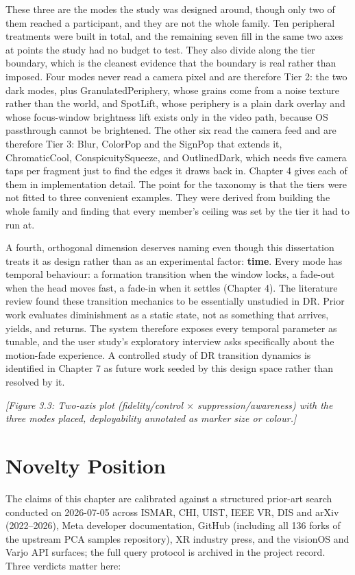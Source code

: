These three are the modes the study was designed around, though only two of them reached a
participant, and they are not the whole family. Ten peripheral treatments were
built in total, and the remaining seven fill in the same two axes at points the study had no budget
to test. They also divide along the tier boundary, which is the cleanest evidence that the boundary
is real rather than imposed. Four modes never read a camera pixel and are therefore Tier 2: the two
dark modes, plus GranulatedPeriphery, whose grains come from a noise texture rather than the world,
and SpotLift, whose periphery is a plain dark overlay and whose focus-window brightness lift exists
only in the video path, because OS passthrough cannot be brightened. The other six read the camera
feed and are therefore Tier 3: Blur, ColorPop and the SignPop that extends it, ChromaticCool,
ConspicuitySqueeze, and OutlinedDark, which needs five camera taps per fragment just to find the
edges it draws back in. Chapter 4 gives each of them in implementation detail. The point for the
taxonomy is that the tiers were not fitted to three convenient examples. They were derived from
building the whole family and finding that every member's ceiling was set by the tier it had to run
at.

A fourth, orthogonal dimension deserves naming even though this dissertation treats it as design
rather than as an experimental factor: \textbf{time}. Every mode has temporal behaviour: a formation
transition when the window locks, a fade-out when the head moves fast, a fade-in when it settles
(Chapter 4). The literature review found these transition mechanics to be essentially unstudied
in DR. Prior work evaluates diminishment as a static state, not as something that arrives, yields,
and returns. The system therefore exposes every temporal parameter as tunable, and the user study's
exploratory interview asks specifically about the motion-fade experience. A controlled study of DR
transition dynamics is identified in Chapter 7 as future work seeded by this design space rather than
resolved by it.

\textit{[Figure 3.3: Two-axis plot (fidelity/control $\times$ suppression/awareness) with the three modes
placed, deployability annotated as marker size or colour.]}

\section{Novelty Position}

The claims of this chapter are calibrated against a structured prior-art search conducted on
2026-07-05 across ISMAR, CHI, UIST, IEEE VR, DIS and arXiv (2022–2026), Meta developer documentation,
GitHub (including all 136 forks of the upstream PCA samples repository), XR industry press, and the
visionOS and Varjo API surfaces; the full query protocol is archived in the project record. Three
verdicts matter here:


